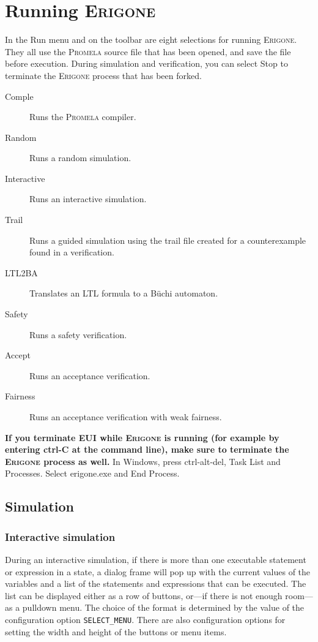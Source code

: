 \documentclass[11pt]{article}
\newcommand{\eri}{\textsc{Erigone}}
\newcommand{\prm}{\textsc{Promela}}
\newcommand{\eui}{\textsc{EUI}}
\newcommand{\p}[1]{\texttt{#1}}
\newcommand{\bu}[1]{\textsf{#1}}
\begin{document}
\section{Running \eri{}}\label{s.run}
In the \bu{Run} menu and on the toolbar are eight selections for
running \eri{}. They all use the \prm{} source file that has been opened,
and save the file before execution.
During simulation and verification,
you can select \bu{Stop} to terminate the \eri{} process that has been forked.
\begin{description}
\item[\bu{Comple}] Runs the \prm{} compiler.
\item[\bu{Random}] Runs a random simulation.
\item[\bu{Interactive}] Runs an interactive simulation.
\item[\bu{Trail}] Runs a guided simulation using the trail
file created for a counterexample found in a verification.
\item[\bu{LTL2BA}] Translates an LTL formula to a B\"{u}chi automaton.
\item[\bu{Safety}] Runs a safety verification.
\item[\bu{Accept}] Runs an acceptance verification.
\item[\bu{Fairness}] Runs an acceptance verification with weak fairness.
\end{description}

\textbf{If you terminate \eui{} while \eri{} is running (for example by
entering \bu{ctrl-C} at the command line), make sure to terminate the
\eri{} process as well.} In Windows, press \bu{ctrl-alt-del}, \bu{Task
List} and \bu{Processes}. Select \bu{erigone.exe} and \bu{End Process}.

\subsection{Simulation}\label{s.sim}

\subsubsection{Interactive simulation}

During an interactive simulation, if there is more than one executable
statement or expression in a state, a dialog frame will pop up with the
current values of the variables and a list of the statements and
expressions that can be executed. The list can be displayed either as a
row of buttons, or---if there is not enough room---as a pulldown menu.
The choice of the format is determined by the value of the configuration
option \p{SELECT\_MENU}. There are also configuration options for
setting the width and height of the buttons or menu items.
\end{document}
